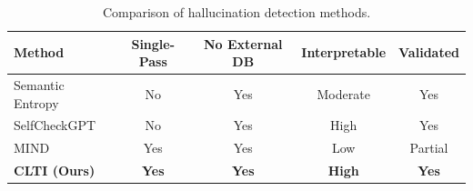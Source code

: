\begin{table}[h]
\centering
\caption{Comparison of hallucination detection methods.}
\label{tab:positioning}
\begin{tabular}{@{}lcccc@{}}
\toprule
Method & Single-Pass & No External DB & Interpretable & Validated \\
\midrule
Semantic Entropy & No & Yes & Moderate & Yes \\
SelfCheckGPT & No & Yes & High & Yes \\
MIND & Yes & Yes & Low & Partial \\
\textbf{CLTI (Ours)} & \textbf{Yes} & \textbf{Yes} & \textbf{High} & \textbf{Yes} \\
\bottomrule
\end{tabular}
\end{table}
